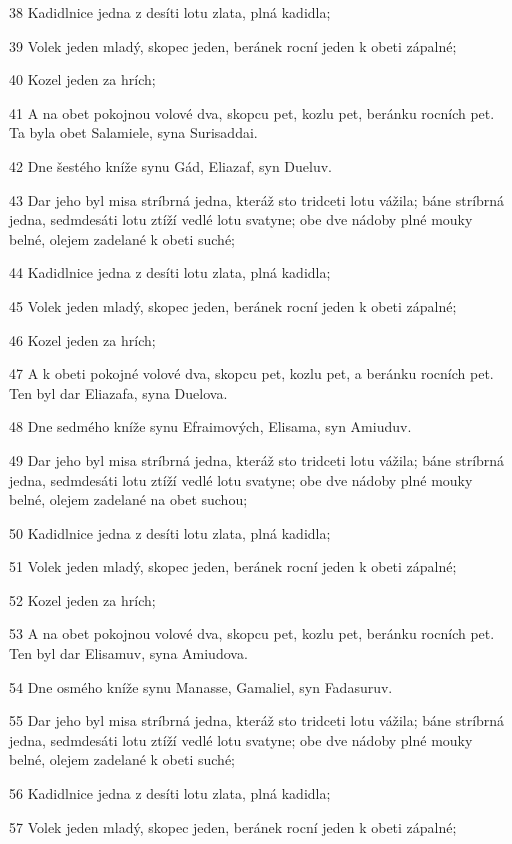 \par 38 Kadidlnice jedna z desíti lotu zlata, plná kadidla;
\par 39 Volek jeden mladý, skopec jeden, beránek rocní jeden k obeti zápalné;
\par 40 Kozel jeden za hrích;
\par 41 A na obet pokojnou volové dva, skopcu pet, kozlu pet, beránku rocních pet. Ta byla obet Salamiele, syna Surisaddai.
\par 42 Dne šestého kníže synu Gád, Eliazaf, syn Dueluv.
\par 43 Dar jeho byl misa stríbrná jedna, kteráž sto tridceti lotu vážila; báne stríbrná jedna, sedmdesáti lotu ztíží vedlé lotu svatyne; obe dve nádoby plné mouky belné, olejem zadelané k obeti suché;
\par 44 Kadidlnice jedna z desíti lotu zlata, plná kadidla;
\par 45 Volek jeden mladý, skopec jeden, beránek rocní jeden k obeti zápalné;
\par 46 Kozel jeden za hrích;
\par 47 A k obeti pokojné volové dva, skopcu pet, kozlu pet, a beránku rocních pet. Ten byl dar Eliazafa, syna Duelova.
\par 48 Dne sedmého kníže synu Efraimových, Elisama, syn Amiuduv.
\par 49 Dar jeho byl misa stríbrná jedna, kteráž sto tridceti lotu vážila; báne stríbrná jedna, sedmdesáti lotu ztíží vedlé lotu svatyne; obe dve nádoby plné mouky belné, olejem zadelané na obet suchou;
\par 50 Kadidlnice jedna z desíti lotu zlata, plná kadidla;
\par 51 Volek jeden mladý, skopec jeden, beránek rocní jeden k obeti zápalné;
\par 52 Kozel jeden za hrích;
\par 53 A na obet pokojnou volové dva, skopcu pet, kozlu pet, beránku rocních pet. Ten byl dar Elisamuv, syna Amiudova.
\par 54 Dne osmého kníže synu Manasse, Gamaliel, syn Fadasuruv.
\par 55 Dar jeho byl misa stríbrná jedna, kteráž sto tridceti lotu vážila; báne stríbrná jedna, sedmdesáti lotu ztíží vedlé lotu svatyne; obe dve nádoby plné mouky belné, olejem zadelané k obeti suché;
\par 56 Kadidlnice jedna z desíti lotu zlata, plná kadidla;
\par 57 Volek jeden mladý, skopec jeden, beránek rocní jeden k obeti zápalné;
